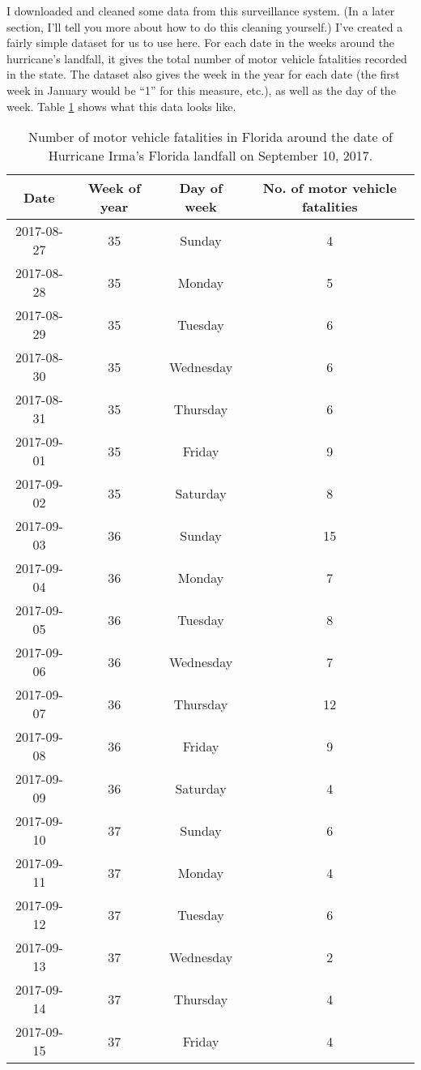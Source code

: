 \documentclass[]{tufte-book}
\begin{document}
I downloaded and cleaned some data from this surveillance system. (In a later section,
I'll tell you more about how to do this cleaning yourself.) I've created a fairly
simple dataset for us to use here. For each date in the weeks around the hurricane's
landfall, it gives the total number of motor vehicle fatalities recorded in the
state. The dataset also gives the week in the year for each date (the first week in
January would be ``1'' for this measure, etc.), as well as the day of the week.
Table \ref{tab:exampledata} shows what this data looks like.

\begin{table}[t]

\caption{\label{tab:exampledata}Number of motor vehicle fatalities in Florida around the date of Hurricane Irma's Florida landfall on September 10, 2017.}
\centering
\begin{tabular}{c|c|c|c}
\hline
Date & Week of year & Day of week & No. of motor vehicle fatalities\\
\hline
2017-08-27 & 35 & Sunday & 4\\
\hline
2017-08-28 & 35 & Monday & 5\\
\hline
2017-08-29 & 35 & Tuesday & 6\\
\hline
2017-08-30 & 35 & Wednesday & 6\\
\hline
2017-08-31 & 35 & Thursday & 6\\
\hline
2017-09-01 & 35 & Friday & 9\\
\hline
2017-09-02 & 35 & Saturday & 8\\
\hline
2017-09-03 & 36 & Sunday & 15\\
\hline
2017-09-04 & 36 & Monday & 7\\
\hline
2017-09-05 & 36 & Tuesday & 8\\
\hline
2017-09-06 & 36 & Wednesday & 7\\
\hline
2017-09-07 & 36 & Thursday & 12\\
\hline
2017-09-08 & 36 & Friday & 9\\
\hline
2017-09-09 & 36 & Saturday & 4\\
\hline
2017-09-10 & 37 & Sunday & 6\\
\hline
2017-09-11 & 37 & Monday & 4\\
\hline
2017-09-12 & 37 & Tuesday & 6\\
\hline
2017-09-13 & 37 & Wednesday & 2\\
\hline
2017-09-14 & 37 & Thursday & 4\\
\hline
2017-09-15 & 37 & Friday & 4\\

\end{tabular}
\end{table}
\end{document}
